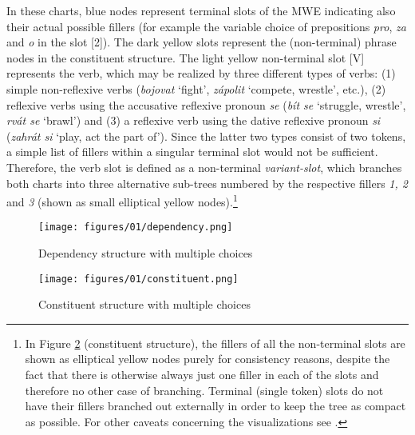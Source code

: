 \documentclass[output=paper,colorlinks,citecolor=brown]{langscibook}
\begin{document}
In these charts, blue nodes represent terminal slots of the MWE indicating also their actual possible fillers (for example the variable choice of prepositions \textit{pro}, \textit{za} and \textit{o} in the slot [2]). The dark yellow slots represent the (non-terminal) phrase nodes in the constituent structure. The light yellow non-terminal slot [V] represents the verb, which may be realized by three different types of verbs: (1) simple non-reflexive verbs (\textit{bojovat} `fight', \textit{zápolit} `compete, wrestle', etc.), (2) reflexive verbs using the accusative reflexive pronoun \textit{se} (\textit{bít se} `struggle, wrestle', \textit{rvát se} `brawl') and (3) a reflexive verb  using the dative reflexive pronoun \textit{si} (\textit{zahrát si} `play, act the part of'). Since the latter two types consist of two tokens, a simple list of fillers within a singular terminal slot would not be sufficient. Therefore, the verb slot is defined as a non-terminal \textit{variant-slot}, which branches both charts into three alternative sub-trees numbered by the respective fillers \textit{1, 2} and \textit{3} (shown as small elliptical yellow nodes).\footnote{In Figure \ref{fig:constituent} (constituent structure), the fillers of all the non-terminal slots are shown as elliptical yellow nodes purely for consistency reasons, despite the fact that there is otherwise always just one filler in each of the slots and therefore no other case of branching. Terminal (single token) slots do not have their fillers branched out externally in order to keep the tree as compact as possible. For other caveats concerning the visualizations see \citet{Vondricka:2019}.}

\begin{figure}
    \centering
    \texttt{[image: figures/01/dependency.png]}
    \caption{Dependency structure with multiple choices}
    \label{fig:dependency}
\end{figure}

\begin{figure}
    \texttt{[image: figures/01/constituent.png]}
    \caption{Constituent structure with multiple choices}
    \label{fig:constituent}
\end{figure}
\end{document}
